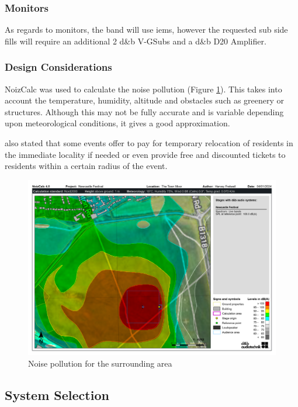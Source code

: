         \subsubsection{Monitors}
            As regards to monitors, the band will use \gls{iem}s, however the requested sub side fills will require an additional 2 d\&b V-GSubs and a d\&b D20 Amplifier.
            
        \subsubsection{Design Considerations}            
            NoizCalc was used to calculate the noise pollution (Figure \ref{fig:noise_pollution}). This takes into account the temperature, humidity, altitude and obstacles such as greenery or structures. Although this may not be fully accurate and is variable depending upon meteorological conditions, it gives a good approximation.

            \citet{lwestbury2016} also stated that some events offer to pay for temporary relocation of residents in the immediate locality if needed or even provide free and discounted tickets to residents within a certain radius of the event.
            
            \begin{figure}[H]
                \centering
                \includegraphics[width=1\linewidth]{Images/noise_polution.png}
                \caption{Noise pollution for the surrounding area}
                \label{fig:noise_pollution}
            \end{figure}

    \subsection{System Selection}        
